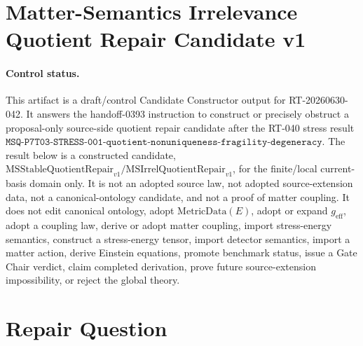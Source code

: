 \section*{Matter-Semantics Irrelevance Quotient Repair Candidate v1}

\paragraph{Control status.}
This artifact is a draft/control Candidate Constructor output for
RT-20260630-042. It answers the handoff-0393 instruction to construct or
precisely obstruct a proposal-only source-side quotient repair candidate after
the RT-040 stress result
\(\texttt{MSQ-P7T03-STRESS-001-quotient-nonuniqueness-fragility-degeneracy}\).
The result below is a constructed candidate,
\(\mathrm{MSStableQuotientRepair}_{v1}/
\mathrm{MSIrrelQuotientRepair}_{v1}\), for the finite/local current-basis
domain only. It is not an adopted source law, not adopted source-extension
data, not a canonical-ontology candidate, and not a proof of matter coupling.
It does not edit canonical ontology, adopt \(\mathrm{MetricData}(E)\), adopt
or expand \(g_{\mathrm{eff}}\), adopt a coupling law, derive or adopt matter
coupling, import stress-energy semantics, construct a stress-energy tensor,
import detector semantics, import a matter action, derive Einstein equations,
promote benchmark status, issue a Gate Chair verdict, claim completed
derivation, prove future source-extension impossibility, or reject the global
theory.

\newcommand{\Bcur}{B_{\mathrm{cur}}}
\newcommand{\MSAdm}{\mathrm{MSAdm}_{v1}}
\newcommand{\MSCertQuot}{\mathrm{MSCertFiberQuot}_{v1}}
\newcommand{\MSStableRepair}{\mathrm{MSStableQuotientRepair}_{v1}}
\newcommand{\MSIrrelRepair}{\mathrm{MSIrrelQuotientRepair}_{v1}}
\newcommand{\MSSig}{\Sigma^{\mathrm{rep}}_E}
\newcommand{\MSRepEq}{\sim_{\mathrm{MSRep},E}}
\newcommand{\MSRepProj}{\pi^{\mathrm{rep}}_E}
\newcommand{\MSRepDisc}{D^{\mathrm{rep}}_E}
\newcommand{\MSFail}{\mathrm{MatterSemanticsFailureObstruction}_{v1}}
\newcommand{\NoTarget}{\mathrm{NoTargetImport}_{v1}}
\newcommand{\NoDetector}{\mathrm{NoDetectorImport}_{v1}}
\newcommand{\NoSE}{\mathrm{NoStressEnergyImport}_{v1}}
\newcommand{\NoAction}{\mathrm{NoMatterActionImport}_{v1}}

\newtheorem{definition}{Definition}
\newtheorem{proposition}{Proposition}

\section{Repair Question}

